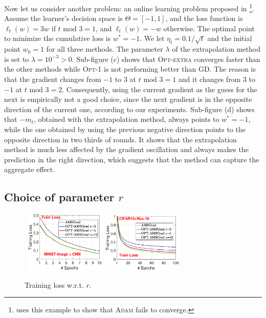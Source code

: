 \documentclass[wcp]{jmlr}
\begin{document}
Now let us consider another problem: an online learning problem proposed in \citep{RKK18}
\footnote{\citep{RKK18} uses this example to show that \textsc{Adam} \citep{KB15} fails to converge.}.
Assume the learner's decision space is $\Theta=[-1,1]$, and the loss function is $\ell_t(w) = 3 w$ if $t \text{ mod } 3 = 1$, and $\ell_t(w) = - w$ otherwise.
The optimal point to minimize the cumulative loss is $w^*=-1$.
We let $\eta_t=0.1 / \sqrt{t}$ and the initial point $w_0=1$ for all three methods.
The parameter $\lambda$ of the extrapolation method is set to $\lambda=10^{-3}>0$. 
Sub-figure (c) shows that \textsc{Opt-extra} converges faster than the other methods while \textsc{Opt-1} is not performing better than GD.
The reason is that the gradient changes from $-1$ to $3$ at $t \text{ mod } 3 = 1$ and it changes from $3$ to $-1$ at $t \text{ mod } 3 = 2$.
Consequently, using the current gradient as the guess for the next is empirically not a good choice, since the next gradient is in the opposite direction of the current one, according to our experiments.
Sub-figure (d) shows that $-m_t$, obtained with the extrapolation method, always points to $w^*=-1$, while the one obtained by using the previous negative direction points to the opposite direction in two thirds of rounds. 
It shows that the extrapolation method is much less affected by the gradient oscillation and always makes the prediction in the right direction, which suggests that the method can capture the aggregate effect.


\vspace{-0.05in}
\subsection{Choice of parameter $r$}\label{sec:choicer}
\vspace{-0.05in}


\begin{figure}\vspace{-0.4in}
\begin{center}
\mbox{
\includegraphics[width=1.5in]{new_figure/new_mnist_img_figure/mnist_img_train_loss_r3510_2.eps}\hspace{-0.1in}
\includegraphics[width=1.5in]{new_figure/cifar10_train_loss_r3510.eps}
}
\end{center}\vspace{-0.20in}
\caption{Training loss w.r.t. $r$.}\label{fig:compare}\vspace{-0.1in}
\end{figure}
\end{document}
